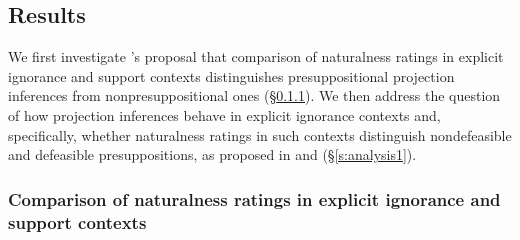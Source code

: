 \documentclass[11pt,fleqn]{article}
\newcommand{\6}{\mbox{$[\hspace*{-.6mm}[$}}
\newcommand{\9}{\mbox{$]\hspace*{-.6mm}]$}}
\newcommand{\citepos}[1]{\citeauthor{#1}'s \citeyear{#1}}
\begin{document}
\subsection{Results}

We first investigate \citepos{mandelkern-etal2020} proposal that comparison of naturalness ratings in explicit ignorance and support contexts distinguishes presuppositional projection inferences from nonpresuppositional ones (\S\ref{s:analysis2}). We then address the question of how projection inferences behave in explicit ignorance contexts and, specifically, whether naturalness ratings in such contexts distinguish nondefeasible and defeasible presuppositions, as proposed in \citealt{simons01} and \citealt{abusch10} (\S\ref{s:analysis1}).

\subsubsection{Comparison of naturalness ratings in explicit ignorance and support contexts}\label{s:analysis2}
\end{document}
